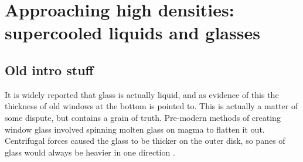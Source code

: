 \section{Approaching high densities: supercooled liquids and glasses}
\label{sec:glass}




\subsection{Old intro stuff}

It is widely reported that glass is actually liquid, and as evidence of this the thickness of old windows at the bottom is pointed to.
This is actually a matter of some dispute, but contains a grain of truth.
Pre-modern methods of creating window glass involved spinning molten glass on magma to flatten it out.
Centrifugal forces caused the glass to be thicker on the outer disk, so panes of glass would always be heavier in one direction%
.

